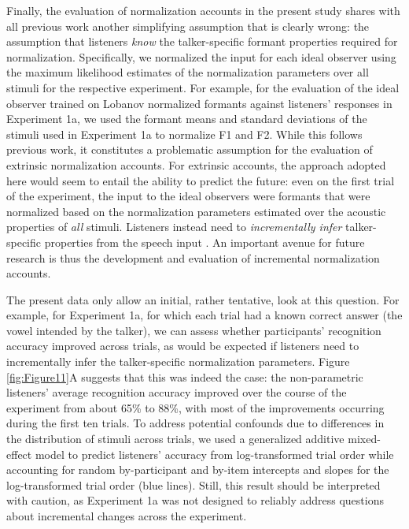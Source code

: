 \documentclass[preprint]{JASA}
\begin{document}
Finally, the evaluation of normalization accounts in the present study shares with all previous work \citep[e.g.,][]{apfelbaum-mcmurray2015, cole2010, mcmurray-jongman2011, barreda2021, nearey1989, richter2017} another simplifying assumption that is clearly wrong: the assumption that listeners \emph{know} the talker-specific formant properties required for normalization. Specifically, we normalized the input for each ideal observer using the maximum likelihood estimates of the normalization parameters over all stimuli for the respective experiment. For example, for the evaluation of the ideal observer trained on Lobanov normalized formants against listeners' responses in Experiment 1a, we used the formant means and standard deviations of the stimuli used in Experiment 1a to normalize F1 and F2. While this follows previous work, it constitutes a problematic assumption for the evaluation of extrinsic normalization accounts. For extrinsic accounts, the approach adopted here would seem to entail the ability to predict the future: even on the first trial of the experiment, the input to the ideal observers were formants that were normalized based on the normalization parameters estimated over the acoustic properties of \emph{all} stimuli. Listeners instead need to \emph{incrementally infer} talker-specific properties from the speech input \citep{barreda-jaeger2025, nearey-assmann2007, xie2023}. An important avenue for future research is thus the development and evaluation of incremental normalization accounts.

The present data only allow an initial, rather tentative, look at this question. For example, for Experiment 1a, for which each trial had a known correct answer (the vowel intended by the talker), we can assess whether participants' recognition accuracy improved across trials, as would be expected if listeners need to incrementally infer the talker-specific normalization parameters. Figure \ref{fig:Figure11}A suggests that this was indeed the case: the non-parametric listeners' average recognition accuracy improved over the course of the experiment from about 65\% to 88\%, with most of the improvements occurring during the first ten trials. To address potential confounds due to differences in the distribution of stimuli across trials, we used a generalized additive mixed-effect model to predict listeners' accuracy from log-transformed trial order while accounting for random by-participant and by-item intercepts and slopes for the log-transformed trial order (blue lines). Still, this result should be interpreted with caution, as Experiment 1a was not designed to reliably address questions about incremental changes across the experiment.
\end{document}

